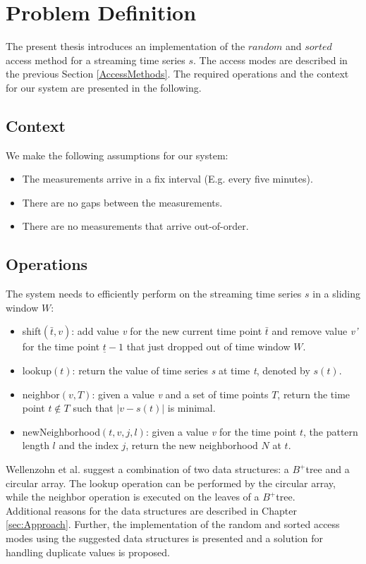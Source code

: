 \documentclass[abstracton,12pt]{scrreprt}
\begin{document}
\chapter{Problem Definition}
\label{ProblemDefinition}
The present thesis introduces an implementation of the $random$ and $sorted$ access method for a streaming time series $s$. The access modes are described in the previous Section \ref{AccessMethods}. The required operations and the context for our system are presented in the following.

\section{Context}
We make the following assumptions for our system: 
\begin{itemize}  
	\item The measurements arrive in a fix interval (E.g. every five minutes). 
	\item There are no gaps between the measurements. 
	\item There are no measurements that arrive out-of-order.
\end{itemize}


\section{Operations}
\label{sec:Op}
The system needs to efficiently perform on the streaming time series $s$ in a sliding window $W$: 
\begin{itemize}  
	\item shift$(\bar{t}, v)$: add value \emph{v} for the new current time point $\bar{t}$ and remove value \emph{v'} for the time point $\underline{t} - 1$ that just dropped out of time window $W$.
	\item lookup$(t)$: return the value of time series \emph{s} at time \emph{t}, denoted by $s(t)$.
	\item neighbor$(v, T)$: given a value \emph{v} and a set of time points $T$, return the time point $t \not\in T$ such that $|v-s(t)|$ is minimal.
	\item newNeighborhood$(t,v,j,l)$: given a value \emph{v} for the time point $t$, the pattern length $l$ and the index $j$, return the new neighborhood $N$ at $t$.
\end{itemize}
Wellenzohn et al.\cite{BScT} suggest a combination of two data structures: a $B^+$tree and a circular array. The lookup operation can be performed by the circular array, while the neighbor operation is executed on the leaves of a $B^+$tree. \\Additional reasons for the data structures are described in Chapter \ref{sec:Approach}. Further, the implementation of the random and sorted access modes using the suggested data structures is presented and a solution for  handling duplicate values is proposed. 
\end{document}
